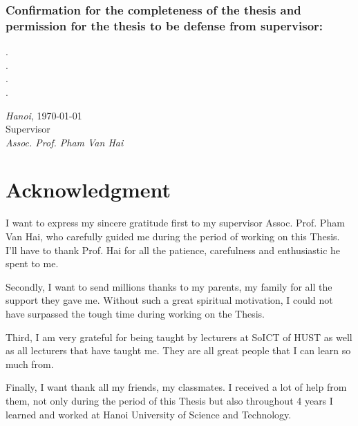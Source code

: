 \documentclass[12pt, sort&compress]{report}
\begin{document}
\subsection*{Confirmation for the completeness of the thesis and permission for the thesis to be defense from supervisor:}
.\dotfill \\
.\dotfill \\ 
.\dotfill \\ 
.\dotfill \\
\begin{minipage}{0.5\textwidth}
	\hspace{1pt}
\end{minipage}
\begin{minipage}[t]{0.5\textwidth}
	
	\begin{center}
		\textit{Hanoi}, \today \\
		Supervisor\\[3cm]
		
		\textit{Assoc. Prof. Pham Van Hai}
	\end{center}
\end{minipage}
\newpage
\chapter*{Acknowledgment}
I want to express my sincere gratitude first to my supervisor Assoc. Prof. Pham Van Hai, who carefully guided me during the period of working on this Thesis. I'll have to thank Prof. Hai for all the patience, carefulness and enthusiastic he spent to me.
\par Secondly, I want to send millions thanks to my parents, my family for all the support they gave me. Without such a great spiritual motivation, I could not have surpassed the tough time during working on the Thesis.
\par Third, I am very grateful for being taught by lecturers at SoICT of HUST as well as all lecturers that have taught me. They are all great people that I can learn so much from.
\par Finally, I want thank all my friends, my classmates. I received a lot of help from them, not only during the period of this Thesis but also throughout 4 years I learned and worked at Hanoi University of Science and Technology.
\newpage
\end{document}
